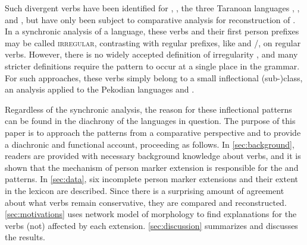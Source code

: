 Such divergent verbs have been identified for \hixka \parencite[188]{hixkaryanaderby1985}, \waiwai \parencite[90]{gildea1998}, the three Taranoan languages \parencite[112--115]{meira1998proto}, \bakairi \parencite{meira2003bakairi}, and \arara \parencite[153]{alves2017arara}, but have only been subject to comparative analysis for  reconstruction of \PTar.
In a synchronic analysis of a language, these verbs and their first person prefixes may be called \textsc{irregular}, contrasting with regular prefixes, like \hixka {} and \trio {}/, on regular verbs.
However, there is no widely accepted definition of irregularity \parencite{stolz2012introduction}, and many stricter definitions \parencite[e.g.,][]{haspelmath2010understanding} require the pattern to occur at a single place in the grammar.
For such approaches, these verbs simply belong to a small inflectional (sub-)class, an analysis applied to the Pekodian languages \bakairi and \arara \parencites[4]{meira2003bakairi}[149]{alves2017arara}.

Regardless of the synchronic analysis, the reason for these inflectional patterns can be found in the diachrony of the languages in question.
The purpose of this paper is to approach the patterns from a comparative perspective and to provide a diachronic and functional account, proceeding as follows.
In \cref{sec:background}, readers are provided with necessary background knowledge about \PC verbs, and it is shown that the mechanism of person marker extension is responsible for the \hixka and \trio patterns.
In \cref{sec:data}, six incomplete person marker extensions and their extent in the lexicon are described.
Since there is a surprising amount of agreement about what verbs remain conservative, they are compared and reconstructed.
\cref{sec:motivations} uses  network model of morphology to find explanations for the verbs (not) affected by each extension.
\cref{sec:discussion} summarizes and discusses the results.

